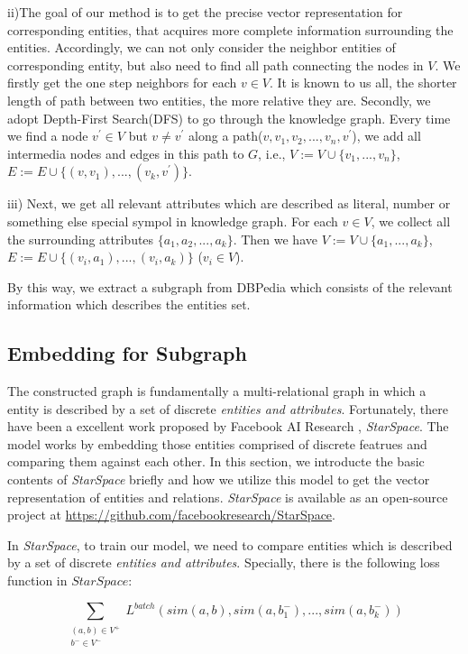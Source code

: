 ii)The goal of our method is to get the precise vector representation for corresponding entities,
that acquires more complete information surrounding the entities.
Accordingly, we can not only consider the neighbor entities of corresponding entity, but also
need to find all path connecting the nodes in $V$. 
We firstly get the one step neighbors for each $v \in V$. It is known to us all, the shorter
length of path between two entities, the more relative they are.
Secondly, we adopt Depth-First Search(DFS) to go through the knowledge graph. Every time we find a node
$v^{'} \in V$ but $v \ne v^{'}$ along a path($v, v_1, v_2,...,v_n, v^{'}$), we add all intermedia 
nodes and edges in this path to $G$, i.e., $V:=V \cup \{v_1, ..., v_n\}$, 
$E:=E \cup \{(v, v_1), ..., (v_k, v^{'})\}$.

iii) Next, we get all relevant attributes which are described as literal, number or something 
else special sympol in knowledge graph. For each $v \in V$, we collect all the surrounding attributes 
$\{a_1, a_2, ..., a_k\}$. Then we have $V:=V \cup \{a_1, ..., a_k\}$, 
$E:=E \cup \{(v_i, a_1), ..., (v_i, a_k)\}$ ($v_i \in V$).

By this way, we extract a subgraph from DBPedia which consists of the relevant information which describes
the entities set.

\subsection{Embedding for Subgraph}
\label{sec:train}
The constructed graph is fundamentally a multi-relational graph in which a entity is described by a set of discrete
\emph{entities and attributes}. Fortunately, there have been a excellent work proposed by Facebook AI Research
, \emph{StarSpace}. The model works by embedding those entities comprised of discrete featrues and
comparing them against each other. In this section, we introducte the basic contents of \emph{StarSpace} briefly and
how we utilize this model to get the vector representation of entities and relations. \emph{StarSpace} is available as
an open-source project at \url{https://github.com/facebookresearch/StarSpace}.

In \emph{StarSpace}, to train our model, we need to compare entities which is described by a set of discrete
\emph{entities and attributes}. Specially, there is the following loss function in $StarSpace$:

\begin{small}
    \begin{equation}
        \nonumber
        \label{starspace_formula}
        \sum_{\substack{(a,b) \in V^+\\ b^- \in V^-}}L^{batch}(sim(a,b),sim(a,b_1^-),...,sim(a,b_k^-))
    \end{equation}
\end{small}

